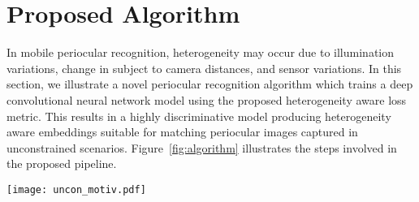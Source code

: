 \documentclass[10pt,twocolumn,letterpaper]{article}
\begin{document}

\section{Proposed Algorithm}
\label{sec:proposed}
In mobile periocular recognition, heterogeneity may occur due to illumination variations, change in subject to camera distances, and sensor variations. In this section, we illustrate a novel periocular recognition algorithm which trains a deep convolutional neural network model using the proposed heterogeneity aware loss metric. This results in a highly discriminative model producing heterogeneity aware embeddings suitable for matching periocular images captured in unconstrained scenarios. Figure~\ref{fig:algorithm} illustrates the steps involved in the proposed pipeline.  


\begin{figure*}
  \centering
  \texttt{[image: uncon\_motiv.pdf]}

  \caption{Training the proposed model: periocular images pertaining to different identities are utilized to forward pass through the deep CNN model with shared weights. During training, the loss function (Figure~\ref{fig:hetero_loss}) optimizes the feature representations so that the ones of the same identity are close to each other (i.e. reduce intra-class variations) while others are pushed further apart in the output embedding space of the deep CNN model. $a$ and $b$ refer to different subjects and domain 1 and 2 refer to different image capture scenarios such as indoor/outdoor and with flash/without flash.}
    \vspace{-12pt}
  \label{fig:algorithm}
\end{figure*}
\end{document}
